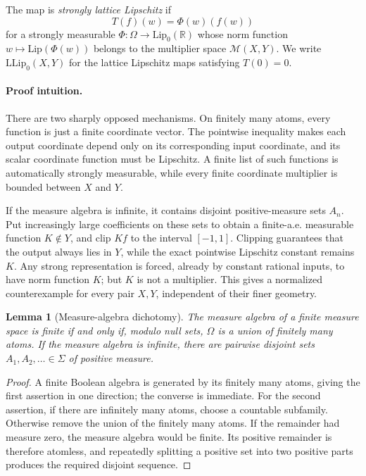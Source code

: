 \documentclass[11pt]{article}
\newtheorem{lemma}[theorem]{Lemma}
\newcommand{\LL}{\mathrm{LLip}}
\newcommand{\Lip}{\mathrm{Lip}}
\newcommand{\M}{\mathcal M}
\newcommand{\1}{\mathbf 1}
\begin{document}
The map is \emph{strongly lattice Lipschitz} if
\[
 T(f)(w)=\Phi(w)(f(w))
\]
for a strongly measurable $\Phi:\Omega\to\Lip_0(\mathbb R)$ whose norm
function $w\mapsto\Lip(\Phi(w))$ belongs to the multiplier space
$\M(X,Y)$.  We write $\LL_0(X,Y)$ for the lattice Lipschitz maps satisfying
$T(0)=0$.

\paragraph{Proof intuition.}
There are two sharply opposed mechanisms.  On finitely many atoms, every
function is just a finite coordinate vector.  The pointwise inequality makes
each output coordinate depend only on its corresponding input coordinate,
and its scalar coordinate function must be Lipschitz.  A finite list of such
functions is automatically strongly measurable, while every finite
coordinate multiplier is bounded between $X$ and $Y$.

If the measure algebra is infinite, it contains disjoint positive-measure
sets $A_n$.  Put increasingly large coefficients on these sets to obtain a
finite-a.e. measurable function $K\notin Y$, and clip $Kf$ to the interval
$[-1,1]$.  Clipping guarantees that the output always lies in $Y$, while the
exact pointwise Lipschitz constant remains $K$.  Any strong representation is
forced, already by constant rational inputs, to have norm function $K$; but
$K$ is not a multiplier.  This gives a normalized counterexample for every
pair $X,Y$, independent of their finer geometry.

\begin{lemma}[Measure-algebra dichotomy]\label{lem:dichotomy}
The measure algebra of a finite measure space is finite if and only if,
modulo null sets, $\Omega$ is a union of finitely many atoms.  If the measure
algebra is infinite, there are pairwise disjoint sets
$A_1,A_2,\ldots\in\Sigma$ of positive measure.
\end{lemma}

\begin{proof}
A finite Boolean algebra is generated by its finitely many atoms, giving the
first assertion in one direction; the converse is immediate.  For the second
assertion, if there are infinitely many atoms, choose a countable subfamily.
Otherwise remove the union of the finitely many atoms.  If the remainder had
measure zero, the measure algebra would be finite.  Its positive remainder is
therefore atomless, and repeatedly splitting a positive set into two positive
parts produces the required disjoint sequence.
\end{proof}
\end{document}
